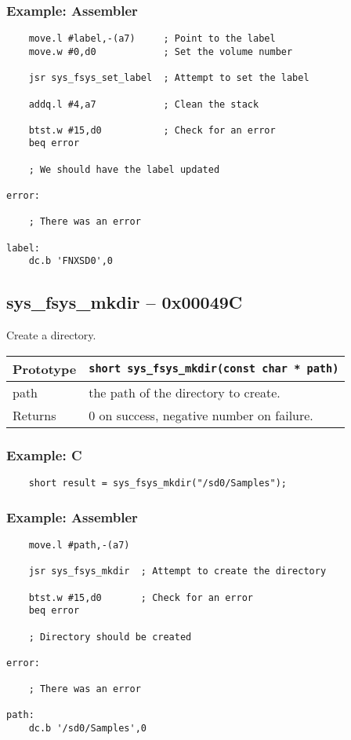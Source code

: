 \subsubsection*{Example: Assembler}
\begin{verbatim}
    move.l #label,-(a7)     ; Point to the label
    move.w #0,d0            ; Set the volume number

    jsr sys_fsys_set_label  ; Attempt to set the label

    addq.l #4,a7            ; Clean the stack

    btst.w #15,d0           ; Check for an error
    beq error

    ; We should have the label updated

error:

    ; There was an error

label:
    dc.b 'FNXSD0',0
\end{verbatim}

\subsection*{sys\_fsys\_mkdir -- 0x00049C}
Create a directory.

\bigskip

\begin{tabular}{|l||l|} \hline
Prototype & \lstinline!short sys_fsys_mkdir(const char * path)! \\ \hline
path & the path of the directory to create. \\ \hline
Returns & 0 on success, negative number on failure. \\ \hline
\end{tabular}

\subsubsection*{Example: C}
\begin{lstlisting}
    short result = sys_fsys_mkdir("/sd0/Samples");
\end{lstlisting}

\subsubsection*{Example: Assembler}
\begin{verbatim}
    move.l #path,-(a7)

    jsr sys_fsys_mkdir  ; Attempt to create the directory

    btst.w #15,d0       ; Check for an error
    beq error

    ; Directory should be created

error:

    ; There was an error

path:
    dc.b '/sd0/Samples',0
\end{verbatim}



